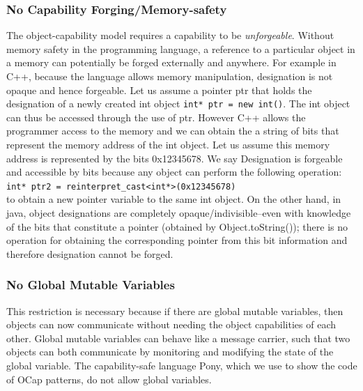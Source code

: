 \documentclass[a4paper,11pt,twoside]{article}
\newcommand{\ablock} {\null\qquad}
\begin{document}
\subsubsection{No Capability Forging/Memory-safety}
The object-capability model requires a capability to be \textit{unforgeable}. Without memory safety in the programming language, a reference to a particular object in a memory can potentially be forged externally and anywhere. For example in C++, because the language allows memory manipulation, designation is not opaque and hence forgeable. Let us assume a pointer ptr that holds the designation of a newly created int object \texttt{\small int* ptr = new int()}. The int object can thus be accessed  through the use of ptr. However C++ allows the programmer access to the memory and we can obtain the a string of bits that represent the memory address of the int object. Let us assume this memory address is represented by the bits 0x12345678. We say Designation is forgeable and accessible by bits because any object can perform the following operation:\\
\ablock\texttt{\small int* ptr2 = reinterpret\_cast<int*>(0x12345678)}\\
to obtain a new pointer variable to the same int object. On the other hand, in java, object designations are completely opaque/indivisible--even with knowledge of the bits that constitute a pointer (obtained by Object.toString()); there is no operation for obtaining the corresponding pointer from this bit information and therefore designation cannot be forged.
\subsubsection{No Global Mutable Variables}
This restriction is necessary because if there are global mutable variables, then objects can now communicate without needing the object capabilities of each other. Global mutable variables can behave like a message carrier, such that two objects can both communicate by monitoring and modifying the state of the global variable. The capability-safe language Pony\cite{clebsch2015}, which we use to show the code of OCap patterns, do not allow global variables.
\end{document}
